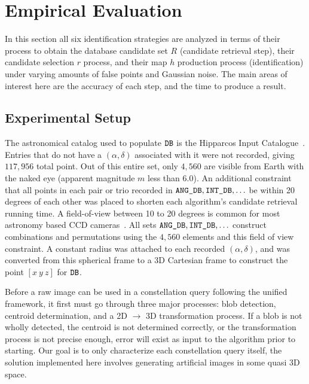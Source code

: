 \newcommand{\AVG}{\mathit{AVG}}

\section{Empirical Evaluation}\label{sec:empiricalEvaluation}
In this section all six identification strategies are analyzed in terms of their process to obtain the database candidate set $R$ (candidate retrieval step), their candidate selection $r$ process, and their map $h$ production process (identification) under varying amounts of false points and Gaussian noise.
The main areas of interest here are the accuracy of each step, and the time to produce a result.


\subsection{Experimental Setup}\label{subsec:experimentalSetup}
The astronomical catalog used to populate $\texttt{DB}$ is the Hipparcos Input Catalogue~\cite{perryman:hipparcosCatalogue}.
Entries that do not have a $\left( \alpha, \delta \right)$ associated with it were not recorded, giving $117{,}956$ total point.
Out of this entire set, only $4{,}560$ are visible from Earth with the naked eye (apparent magnitude $m$ less than 6.0).
An additional constraint that all points in each pair or trio recorded in $\texttt{ANG\_DB}, \texttt{INT\_DB}, \ldots$ be within 20 degrees of each other was placed to shorten each algorithm's candidate retrieval running time.
A field-of-view between 10 to 20 degrees is common for most astronomy based CCD cameras~\cite{mortari:pyramidIdentification}.
All sets $\texttt{ANG\_DB}, \texttt{INT\_DB}, \ldots$ construct combinations and permutations using the $4{,}560$ elements and this field of view constraint.
A constant radius was attached to each recorded $\left(\alpha, \delta \right)$, and was converted from this spherical frame to a 3D Cartesian frame to construct the point $[ x \ y \ z ]$ for $\texttt{DB}$.

Before a raw image can be used in a constellation query following the unified framework, it first must go through three major processes: blob detection, centroid determination, and a 2D $\rightarrow$ 3D transformation process.
If a blob is not wholly detected, the centroid is not determined correctly, or the transformation process is not precise enough, error will exist as input to the algorithm prior to starting.
Our goal is to only characterize each constellation query itself, the solution implemented here involves generating artificial images in some quasi 3D space.

